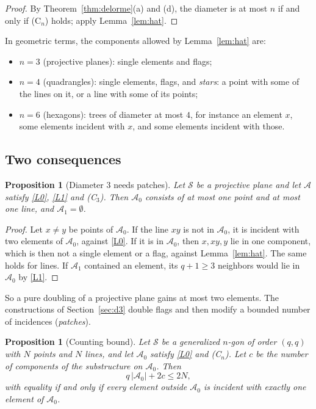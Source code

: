 \documentclass[11pt]{amsart}
\newtheorem{proposition}[theorem]{Proposition}
\theoremstyle{definition}
\theoremstyle{remark}
\newcommand{\cS}{\mathcal{S}}
\newcommand{\cA}{\mathcal{A}}
\begin{document}
\begin{proof}
By Theorem~\ref{thm:delorme}(a) and (d), the diameter is at most $n$ if and only if \textup{(C$_n$)} holds; apply Lemma~\ref{lem:hat}.
\end{proof}

In geometric terms, the components allowed by Lemma~\ref{lem:hat} are:
\begin{itemize}[leftmargin=1.5em]
\item $n=3$ (projective planes): single elements and flags;
\item $n=4$ (quadrangles): single elements, flags, and \emph{stars}: a point with some of the lines on it, or a line with some of its points;
\item $n=6$ (hexagons): trees of diameter at most $4$, for instance an element $x$, some elements incident with $x$, and some elements incident with those.
\end{itemize}

\subsection{Two consequences}
\begin{proposition}[Diameter $3$ needs patches]\label{prop:d3patch}
Let $\cS$ be a projective plane and let $\cA$ satisfy \ref{L0}, \ref{L1} and \textup{(C$_3$)}. Then $\cA_0$ consists of at most one point and at most one line, and $\cA_1=\emptyset$.
\end{proposition}

\begin{proof}
Let $x\ne y$ be points of $\cA_0$. If the line $xy$ is not in $\cA_0$, it is incident with two elements of $\cA_0$, against \ref{L0}. If it is in $\cA_0$, then $x,xy,y$ lie in one component, which is then not a single element or a flag, against Lemma~\ref{lem:hat}. The same holds for lines. If $\cA_1$ contained an element, its $q+1\ge3$ neighbors would lie in $\cA_0$ by \ref{L1}.
\end{proof}

So a pure doubling of a projective plane gains at most two elements. The constructions of Section~\ref{sec:d3} double flags and then modify a bounded number of incidences (\emph{patches}).

\begin{proposition}[Counting bound]\label{prop:count}
Let $\cS$ be a generalized $n$-gon of order $(q,q)$ with $N$ points and $N$ lines, and let $\cA_0$ satisfy \ref{L0} and \textup{(C$_n$)}. Let $c$ be the number of components of the substructure on $\cA_0$. Then
\[
q\,|\cA_0|+2c\le 2N,
\]
with equality if and only if every element outside $\cA_0$ is incident with exactly one element of $\cA_0$.
\end{proposition}
\end{document}
